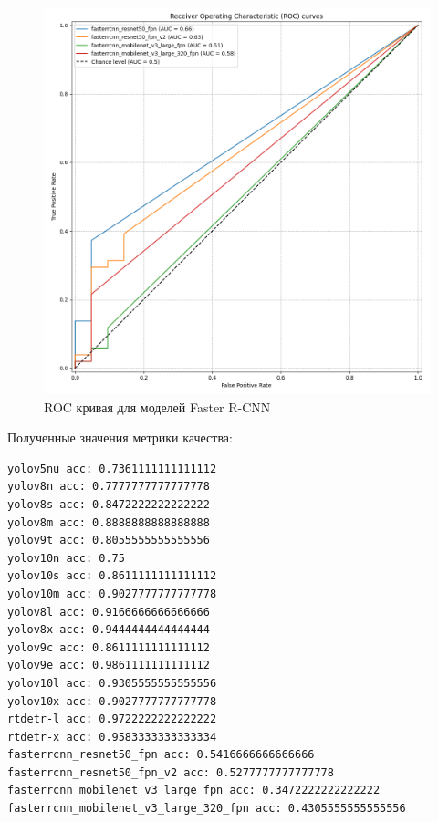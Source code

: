 \documentclass[../document.tex]{subfiles}
\begin{document}
 		\begin{figure}[H]
 			\centering
 			\includegraphics[scale=0.4]{RCNN_roc_curve.png}
 			\caption{ROC кривая для моделей Faster R-CNN}
 		\end{figure}
 		\par Полученные значения метрики качества:
 		\begin{verbatim}
yolov5nu acc: 0.7361111111111112
yolov8n acc: 0.7777777777777778
yolov8s acc: 0.8472222222222222
yolov8m acc: 0.8888888888888888
yolov9t acc: 0.8055555555555556
yolov10n acc: 0.75
yolov10s acc: 0.8611111111111112
yolov10m acc: 0.9027777777777778
yolov8l acc: 0.9166666666666666
yolov8x acc: 0.9444444444444444
yolov9c acc: 0.8611111111111112
yolov9e acc: 0.9861111111111112
yolov10l acc: 0.9305555555555556
yolov10x acc: 0.9027777777777778
rtdetr-l acc: 0.9722222222222222
rtdetr-x acc: 0.9583333333333334
fasterrcnn_resnet50_fpn acc: 0.5416666666666666
fasterrcnn_resnet50_fpn_v2 acc: 0.5277777777777778
fasterrcnn_mobilenet_v3_large_fpn acc: 0.3472222222222222
fasterrcnn_mobilenet_v3_large_320_fpn acc: 0.4305555555555556
 		\end{verbatim}
\end{document}
